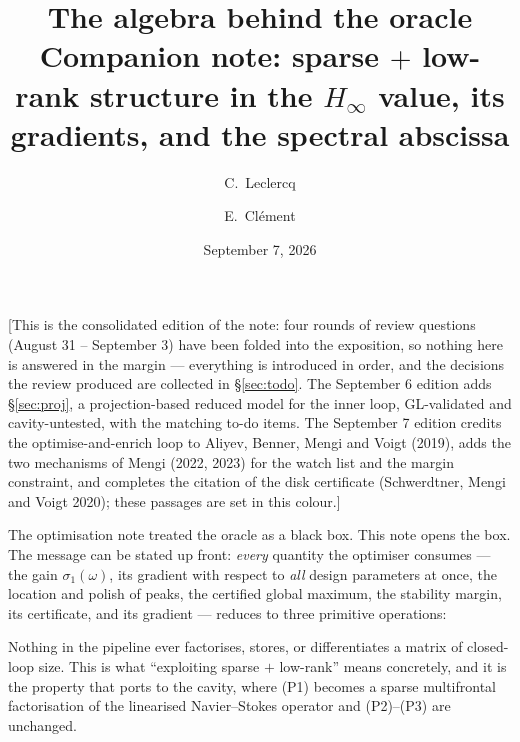 \documentclass[11pt,a4paper]{article}
\title{The algebra behind the oracle\\[3pt]
{\large Companion note: sparse $+$ low-rank structure in the $H_\infty$ value, its
gradients, and the spectral abscissa}}
\author{C.~Leclercq \and E.~Cl\'ement}
\date{September 7, 2026}
\newcommand{\revP}[1]{#1}
\newcommand{\revQ}[1]{{\color{revQ}#1}}
\begin{document}
\maketitle

\noindent
{\small [This is the consolidated edition of the note: four rounds of review questions (August 31 -- September 3) have been folded into the exposition, so nothing here is answered in the margin --- everything is introduced in order, and the decisions the review produced are collected in \S\ref{sec:todo}.  \revP{The
September 6 edition adds \S\ref{sec:proj}, a projection-based reduced model for the inner
loop, GL-validated and cavity-untested, with the matching to-do items.  \revQ{The September 7 edition credits the
optimise-and-enrich loop to Aliyev, Benner, Mengi and Voigt (2019), adds the two
mechanisms of Mengi (2022, 2023) for the watch list and the margin constraint, and
completes the citation of the disk certificate (Schwerdtner, Mengi and Voigt 2020);
these passages are set in this colour.}]}\par\smallskip

The optimisation note treated the oracle as a black box.  This note opens the box.  The
message can be stated up front: \emph{every} quantity the optimiser consumes --- the gain
$\sigma_1(\omega)$, its gradient with respect to \emph{all} design parameters at once, the
location and polish of peaks, the certified global maximum, the stability margin, its
certificate, and its gradient --- reduces to three primitive operations:
\begin{center}
\end{center}
Nothing in the pipeline ever factorises, stores, or differentiates a matrix of closed-loop
size.  This is what ``exploiting sparse $+$ low-rank'' means concretely, and it is the
property that ports to the cavity, where (P1) becomes a sparse multifrontal factorisation
of the linearised Navier--Stokes operator and (P2)--(P3) are unchanged.

}
\end{document}
